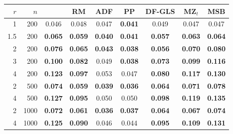 \begin{tabular}{rrccccccc}
\toprule
$r$ & $n$ & \RMGLS{} & RM & ADF & PP & DF-GLS & MZ$_t$ & MSB \\
\midrule
1 & 200 & 0.046 & 0.048 & 0.047 & \textbf{0.041} & 0.049 & 0.047 & 0.047 \\
1.5 & 200 & \textbf{0.065} & \textbf{0.059} & \textbf{0.040} & \textbf{0.041} & \textbf{0.057} & \textbf{0.063} & \textbf{0.064} \\
2 & 200 & \textbf{0.076} & \textbf{0.065} & \textbf{0.043} & \textbf{0.038} & \textbf{0.056} & \textbf{0.070} & \textbf{0.080} \\
3 & 200 & \textbf{0.100} & \textbf{0.082} & 0.049 & \textbf{0.038} & \textbf{0.073} & \textbf{0.099} & \textbf{0.116} \\
4 & 200 & \textbf{0.123} & \textbf{0.097} & 0.053 & 0.047 & \textbf{0.080} & \textbf{0.117} & \textbf{0.130} \\
2 & 500 & \textbf{0.074} & \textbf{0.059} & \textbf{0.039} & \textbf{0.036} & \textbf{0.064} & \textbf{0.071} & \textbf{0.078} \\
4 & 500 & \textbf{0.127} & \textbf{0.095} & 0.050 & 0.050 & \textbf{0.098} & \textbf{0.119} & \textbf{0.135} \\
2 & 1000 & \textbf{0.072} & \textbf{0.061} & \textbf{0.036} & \textbf{0.037} & \textbf{0.064} & \textbf{0.067} & \textbf{0.074} \\
4 & 1000 & \textbf{0.125} & \textbf{0.090} & 0.046 & 0.044 & \textbf{0.095} & \textbf{0.109} & \textbf{0.131} \\
\bottomrule
\end{tabular}

